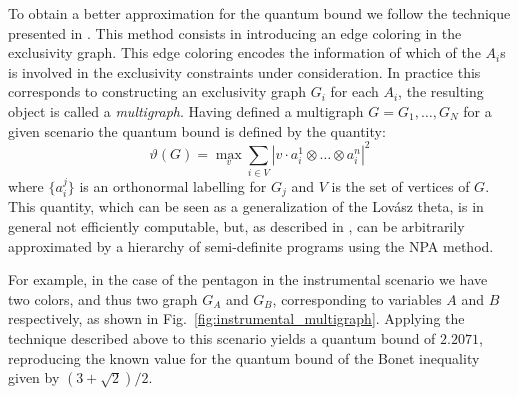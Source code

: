 \documentclass[letterpaper]{article}
\begin{document}
To obtain a better approximation for the quantum bound we follow the technique presented in \cite{rabelo2014}. 
This method consists in introducing an edge coloring in the exclusivity graph. 
This edge coloring encodes the information of which of the $A_i$s is involved in the exclusivity constraints under consideration.
In practice this corresponds to constructing an exclusivity graph $G_i$ for each
$A_i$, the resulting object is called a \emph{multigraph}. 
Having defined a multigraph $G = {G_1, \ldots, G_N}$ for a given scenario the
quantum bound is defined by the quantity:
\begin{equation}
    \vartheta(G) = \max_{v} \sum_{i \in V} |v \cdot a^1_i \otimes \dots \otimes a^n_i|^2
    \label{eq:multigraph_lovazs}
\end{equation}
where $\{a^j_i\}$ is an orthonormal labelling for $G_j$ and $V$ is the set of vertices of $G$. This quantity, which can be seen as a generalization of the Lov\'asz theta, is in general not efficiently computable, but, as described in \cite{rabelo2014}, can be arbitrarily approximated by a hierarchy of semi-definite programs using the NPA method.

For example, in the case of the pentagon in the instrumental scenario we have two colors, and thus two graph $G_A$ and $G_B$, corresponding to variables $A$ and $B$ respectively, as shown in Fig.~\ref{fig:instrumental_multigraph}.
Applying the technique described above to this scenario yields a quantum
bound of $2.2071$, reproducing the known value for the quantum bound of the Bonet inequality given by $(3+\sqrt{2})/2$.
\end{document}
